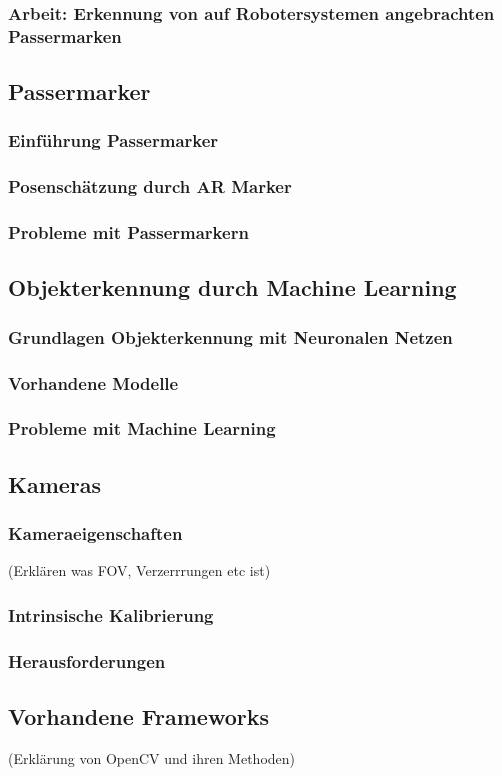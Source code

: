 \subsubsection{Arbeit: Erkennung von auf Robotersystemen angebrachten Passermarken}


\subsection{Passermarker}
\subsubsection{Einführung Passermarker}
\subsubsection{Posenschätzung durch AR Marker}
\subsubsection{Probleme mit Passermarkern}


\subsection{Objekterkennung durch Machine Learning}
\subsubsection{Grundlagen Objekterkennung mit Neuronalen Netzen}
\subsubsection{Vorhandene Modelle}
\subsubsection{Probleme mit Machine Learning}


\subsection{Kameras}
\subsubsection{Kameraeigenschaften}
(Erklären was FOV, Verzerrrungen etc ist)
\subsubsection{Intrinsische Kalibrierung}
\subsubsection{Herausforderungen}

\subsection{Vorhandene Frameworks}
(Erklärung von OpenCV und ihren Methoden)

